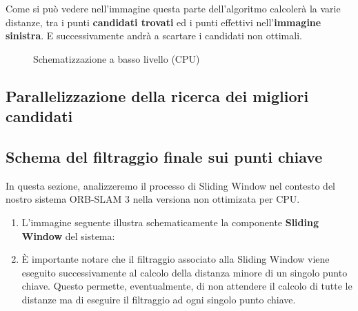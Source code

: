 \documentclass[12pt,a4paper]{report}
\begin{document}
Come si può vedere nell'immagine questa parte dell'algoritmo calcolerà la varie distanze, tra i punti \textbf{candidati trovati} ed i punti effettivi nell'\textbf{immagine sinistra}.
E successivamente andrà a scartare i candidati non ottimali.



\begin{figure}[H]
    \centering
    \caption{Schematizzazione a basso livello (CPU) }
\end{figure}

\subsection{Parallelizzazione della ricerca dei migliori candidati}

\subsection{Schema del filtraggio finale sui punti chiave}

In questa sezione, analizzeremo il processo di Sliding Window nel contesto del nostro sistema ORB-SLAM 3 nella versiona non ottimizata per CPU. 

\begin{enumerate}
    \item L'immagine seguente illustra schematicamente la componente \textbf{Sliding Window} del sistema:
    
    \item È importante notare che il filtraggio associato alla Sliding Window viene eseguito successivamente al calcolo della distanza minore di un singolo punto chiave. Questo permette, eventualmente, di non attendere il calcolo di tutte le distanze ma di eseguire il filtraggio ad ogni singolo punto chiave.
\end{enumerate}
\end{document}
